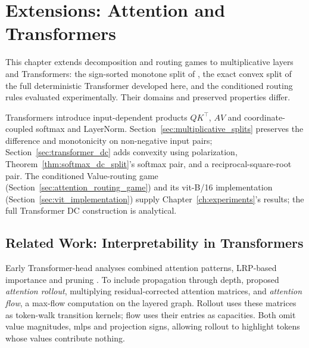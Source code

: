 \chapter{Extensions: Attention and Transformers}\label{ch:transformers}

This chapter extends decomposition and routing games to multiplicative layers and Transformers: the sign-sorted monotone split of \textcite{hiddenMono}, the exact convex split of the full deterministic Transformer developed here, and the conditioned routing rules evaluated experimentally. Their domains and preserved properties differ.

Transformers \parencite{Vaswani2017} introduce input-dependent products $QK^\top$, $AV$ and coordinate-coupled softmax and LayerNorm. Section~\ref{sec:multiplicative_splits} preserves the difference and monotonicity on non-negative input pairs; Section~\ref{sec:transformer_dc} adds convexity using polarization, Theorem~\ref{thm:softmax_dc_split}'s softmax pair, and a reciprocal-square-root pair. The conditioned Value-routing game (Section~\ref{sec:attention_routing_game}) and its \ac{vit}-B/16 implementation (Section~\ref{sec:vit_implementation}) supply Chapter~\ref{ch:experiments}'s results; the full Transformer DC construction is analytical.

\section{Related Work: Interpretability in Transformers}\label{sec:related_work_transformers}

Early Transformer-head analyses combined attention patterns, LRP-based importance and pruning \parencite{Voita2019}. To include propagation through depth, \textcite{Abnar2020attention} proposed \emph{attention rollout}, multiplying residual-corrected attention matrices, and \emph{attention flow}, a max-flow computation on the layered graph. Rollout uses these matrices as token-walk transition kernels; flow uses their entries as capacities. Both omit value magnitudes, \acp{mlp} and projection signs, allowing rollout to highlight tokens whose values contribute nothing.

